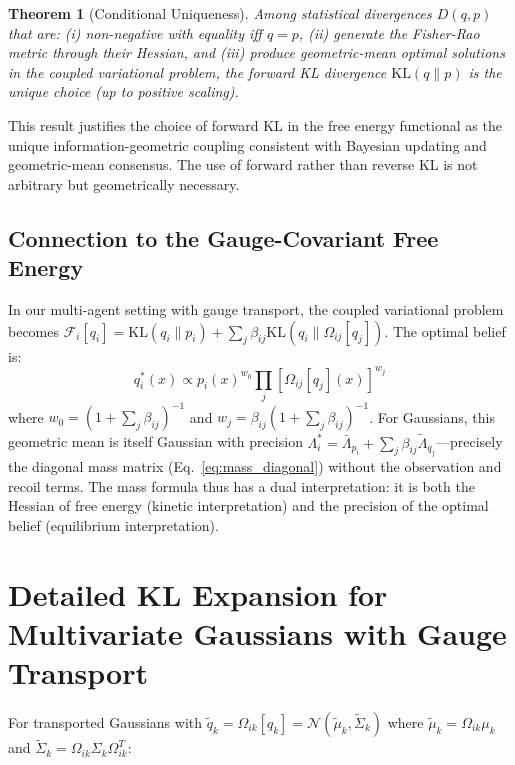 \documentclass[11pt]{article}
\newtheorem{theorem}{Theorem}
\begin{document}
\begin{theorem}[Conditional Uniqueness]
Among statistical divergences $D(q, p)$ that are: (i) non-negative with equality iff $q = p$, (ii) generate the Fisher-Rao metric through their Hessian, and (iii) produce geometric-mean optimal solutions in the coupled variational problem, the forward KL divergence $\mathrm{KL}(q \| p)$ is the unique choice (up to positive scaling).
\end{theorem}

This result justifies the choice of forward KL in the free energy functional as the unique information-geometric coupling consistent with Bayesian updating and geometric-mean consensus. The use of forward rather than reverse KL is not arbitrary but geometrically necessary.

\subsection*{Connection to the Gauge-Covariant Free Energy}

In our multi-agent setting with gauge transport, the coupled variational problem becomes $\mathcal{F}_i[q_i] = \mathrm{KL}(q_i \| p_i) + \sum_j \beta_{ij} \mathrm{KL}(q_i \| \Omega_{ij}[q_j])$. The optimal belief is:
\begin{equation}
q_i^*(x) \propto p_i(x)^{w_0} \prod_j \left[\Omega_{ij}[q_j](x)\right]^{w_j}
\end{equation}
where $w_0 = (1 + \sum_j \beta_{ij})^{-1}$ and $w_j = \beta_{ij}(1 + \sum_j \beta_{ij})^{-1}$. For Gaussians, this geometric mean is itself Gaussian with precision $\Lambda_i^* = \bar{\Lambda}_{p_i} + \sum_j \beta_{ij}\tilde{\Lambda}_{q_j}$---precisely the diagonal mass matrix (Eq.~\ref{eq:mass_diagonal}) without the observation and recoil terms. The mass formula thus has a dual interpretation: it is both the Hessian of free energy (kinetic interpretation) and the precision of the optimal belief (equilibrium interpretation).

\section{Detailed KL Expansion for Multivariate Gaussians with Gauge Transport}
\label{app:detailed_kl}

For transported Gaussians with $\tilde{q}_k = \Omega_{ik}[q_k] = \mathcal{N}(\tilde{\mu}_k, \tilde{\Sigma}_k)$ where $\tilde{\mu}_k = \Omega_{ik}\mu_k$ and $\tilde{\Sigma}_k = \Omega_{ik}\Sigma_k\Omega_{ik}^T$:
\end{document}
